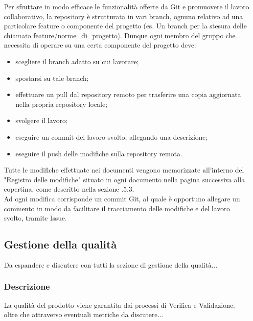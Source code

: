         Per sfruttare in modo efficace le funzionalità offerte da Git e promuovere il lavoro collaborativo, la repository è strutturata in vari branch, ognuno relativo ad una particolare feature o componente del progetto (es. Un branch per la stesura delle \NdP{} chiamato feature/norme\_di\_progetto). Dunque ogni membro del gruppo che necessita di operare su una certa componente del progetto deve:
        \begin{itemize}
          \item scegliere il branch adatto su cui lavorare;
          \item spostarsi su tale branch;
          \item effettuare un pull dal repository remoto per trasferire una copia aggiornata nella propria repository locale;
          \item svolgere il lavoro;
          \item eseguire un commit del lavoro svolto, allegando una descrizione;
          \item eseguire il push delle modifiche sulla repository remota.
        \end{itemize}

        Tutte le modifiche effettuate nei documenti vengono memorizzate all'interno del "Registro delle modifiche" situato in ogni documento nella pagina successiva alla copertina, come descritto nella sezione .5.3.\\
        Ad ogni modifica corrisponde un commit Git, al quale è opportuno allegare un commento in modo da facilitare il tracciamento delle modifiche e del lavoro svolto, tramite Issue.

  \subsection{Gestione della qualità}
    Da espandere e discutere con tutti la sezione di gestione della qualità...
    \subsubsection{Descrizione}
      La qualità del prodotto viene garantita dai processi di Verifica e Validazione, oltre che attraverso eventuali metriche da discutere...

